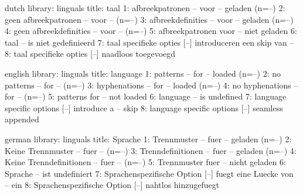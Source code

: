 


\unprotect

\startmessages  dutch  library: linguals
  title: taal
      1: afbreekpatronen -- voor -- geladen (n=--)
      2: geen afbreekpatronen -- voor -- (n=--)
      3: afbreekdefinities -- voor -- geladen (n=--)
      4: geen afbreekdefinities -- voor -- (n=--)
      5: afbreekpatronen voor -- niet geladen
      6: taal -- is niet gedefinieerd
      7: taal specifieke opties [--] introduceren een skip van --
      8: taal specifieke opties [--] naadloos toegevoegd
\stopmessages

\startmessages  english  library: linguals
  title: language
      1: patterns -- for -- loaded (n=--)
      2: no patterns -- for -- (n=--)
      3: hyphenations -- for -- loaded (n=--)
      4: no hyphenations -- for -- (n=--)
      5: patterns for -- not loaded
      6: language -- is undefined
      7: language specific options [--] introduce a -- skip
      8: language specific options [--] seamless appended
\stopmessages

\startmessages  german  library: linguals
  title: Sprache
      1: Trennmuster -- fuer -- geladen (n=--)
      2: Keine Trennmuster -- fuer -- (n=--)
      3: Trenndefinitionen -- fuer -- geladen (n=--)
      4: Keine Trenndefinitionen -- fuer -- (n=--)
      5: Trennmuster fuer -- nicht geladen
      6: Sprache -- ist undefiniert
      7: Sprachenspezifische Option [--] fuegt eine Luecke von -- ein
      8: Sprachenspezifische Option [--] nahtlos hinzugefuegt
\stopmessages



